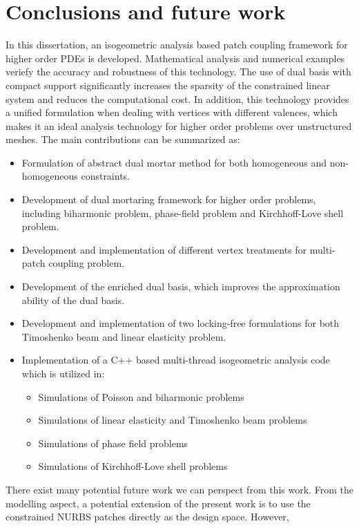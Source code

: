 \chapter{Conclusions and future work}
\label{chp:chapter7}
\graphicspath{{figures/}{figures/chapter6/}}

In this dissertation, an isogeometric analysis based patch coupling framework for higher order PDEs is developed. Mathematical analysis and numerical examples veriefy the accuracy and robustness of this technology. The use of dual basis with compact support significantly increases the sparsity of the constrained linear system and reduces the computational cost. In addition, this technology provides a unified formulation when dealing with vertices with different valences, which makes it an ideal analysis technology for higher order problems over unstructured meshes. The main contributions can be summarized as:
\begin{itemize}
  \item Formulation of abstract dual mortar method for both homogeneous and non-homogeneous constraints.
  \item Development of \Bezier dual mortaring framework for higher order problems, including biharmonic problem, phase-field problem and Kirchhoff-Love shell problem.
  \item Development and implementation of different vertex treatments for multi-patch coupling problem.
  \item Development of the enriched \Bezier dual basis, which improves the approximation ability of the \Bezier dual basis.
  \item Development and implementation of two locking-free formulations for both Timoshenko beam and linear elasticity problem. 
  \item Implementation of a C++ based multi-thread isogeometric analysis code which is utilized in:
  \begin{itemize}
    \item Simulations of Poisson and biharmonic problems
    \item Simulations of linear elasticity and Timoshenko beam problems
    \item Simulations of phase field problems
    \item Simulations of Kirchhoff-Love shell problems
  \end{itemize}
\end{itemize}

There exist many potential future work we can perspect from this work. From the modelling aspect, a potential extension of the present work is to use the constrained NURBS patches directly as the design space. However, 